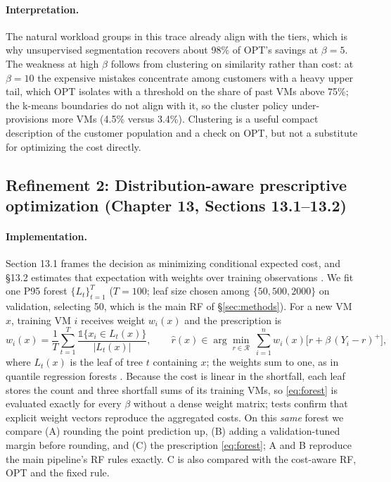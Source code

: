 \documentclass[10pt]{article}
\begin{document}
\paragraph{Interpretation.} The natural workload groups in this trace already align with the tiers, which is why unsupervised segmentation recovers about 98\% of OPT's savings at $\beta=5$. The weakness at high $\beta$ follows from clustering on similarity rather than cost: at $\beta=10$ the expensive mistakes concentrate among customers with a heavy upper tail, which OPT isolates with a threshold on the share of past VMs above 75\%; the k-means boundaries do not align with it, so the cluster policy under-provisions more VMs (4.5\% versus 3.4\%). Clustering is a useful compact description of the customer population and a check on OPT, but not a substitute for optimizing the cost directly.

\subsection{Refinement 2: Distribution-aware prescriptive optimization (Chapter 13, Sections 13.1--13.2)}

\paragraph{Implementation.} Section 13.1 frames the decision as minimizing conditional expected cost, and \S13.2 estimates that expectation with weights over training observations \citep{bertsimas2020predictive}. We fit one P95 forest $\{L_t\}_{t=1}^{T}$ ($T=100$; leaf size chosen among $\{50,500,2000\}$ on validation, selecting 50, which is the main RF of \S\ref{sec:methods}). For a new VM $x$, training VM $i$ receives weight $w_i(x)$ and the prescription is
\begin{equation}
w_i(x)=\frac{1}{T}\sum_{t=1}^{T}\frac{\mathbb{1}\{x_i\in L_t(x)\}}{|L_t(x)|},\qquad
\hat r(x)\in\arg\min_{r\in\mathcal{R}}\ \sum_{i=1}^{n} w_i(x)\big[r+\beta\,(Y_i-r)^+\big],
\label{eq:forest}
\end{equation}
where $L_t(x)$ is the leaf of tree $t$ containing $x$; the weights sum to one, as in quantile regression forests \citep{meinshausen2006qrf}. Because the cost is linear in the shortfall, each leaf stores the count and three shortfall sums of its training VMs, so \eqref{eq:forest} is evaluated exactly for every $\beta$ without a dense weight matrix; tests confirm that explicit weight vectors reproduce the aggregated costs. On this \emph{same} forest we compare (A) rounding the point prediction up, (B) adding a validation-tuned margin before rounding, and (C) the prescription \eqref{eq:forest}; A and B reproduce the main pipeline's RF rules exactly. C is also compared with the cost-aware RF, OPT and the fixed rule.
\end{document}
